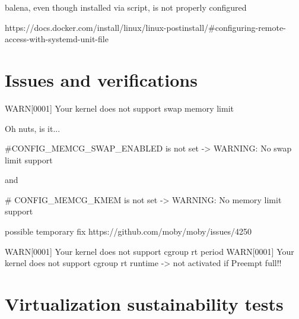 \documentclass[]{scrartcl}
\begin{document}
balena, even though installed via script, is not properly configured

https://docs.docker.com/install/linux/linux-postinstall/#configuring-remote-access-with-systemd-unit-file


\section{Issues and verifications}

WARN[0001] Your kernel does not support swap memory limit 

Oh nuts, is it...

#CONFIG_MEMCG_SWAP_ENABLED is not set -> WARNING: No swap limit support

and

# CONFIG_MEMCG_KMEM is not set -> WARNING: No memory limit support

possible temporary fix https://github.com/moby/moby/issues/4250



WARN[0001] Your kernel does not support cgroup rt period 
WARN[0001] Your kernel does not support cgroup rt runtime 
-> not activated if Preempt full!!

\section{Virtualization sustainability tests}

\end{document}
